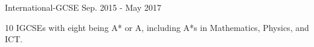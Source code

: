 \begin{cventries}
    \cventry
    {International-GCSE} %
    {} %
    {} %
    {Sep. 2015 - May 2017} %
    {
        \begin{cvitems} %
            \item {10 IGCSEs with eight being A* or A, including A*s in Mathematics, Physics, and ICT.}
        \end{cvitems}
    }

\end{cventries}
